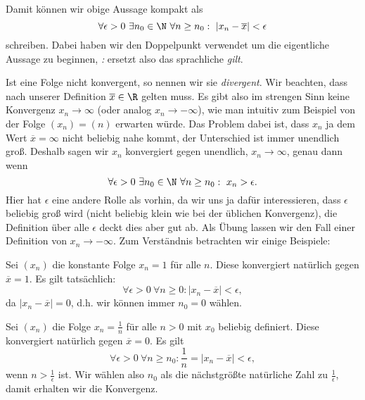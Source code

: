 \documentclass[letterpaper,10pt,english]{jupyterBook}
\begin{document}
Damit können wir obige Aussage kompakt als
\begin{equation*}
\forall \epsilon > 0 ~\exists n_0 \in \N ~\forall n \geq n_0: ~\vert x_n - \overline{x} \vert < \epsilon
\end{equation*}
schreiben. Dabei haben wir den Doppelpunkt verwendet um die eigentliche Aussage zu beginnen, \emph{:} ersetzt also das sprachliche \emph{gilt}.

Ist eine Folge nicht konvergent, so nennen wir sie \emph{divergent}. Wir beachten, dass nach unserer Definition \(\overline{x} \in \R\) gelten muss. Es gibt also im strengen Sinn keine Konvergenz \(x_n \rightarrow \infty\) (oder analog \(x_n \rightarrow -\infty\)), wie man intuitiv zum Beispiel von der Folge \((x_n) = (n)\) erwarten würde. Das Problem dabei ist, dass \(x_n\) ja dem Wert \(\overline{x}=\infty\) nicht beliebig nahe kommt, der Unterschied ist immer unendlich groß. Deshalb sagen wir \(x_n\) konvergiert gegen unendlich, \(x_n \rightarrow \infty\), genau dann wenn
\begin{equation*}
 \forall \epsilon > 0 ~\exists n_0 \in \N ~\forall n \geq n_0: ~ x_n > \epsilon .
\end{equation*}
Hier hat \(\epsilon\) eine andere Rolle als vorhin, da wir uns ja dafür interessieren, dass \(\epsilon\) beliebig groß wird (nicht beliebig klein wie bei der üblichen Konvergenz), die Definition über alle \(\epsilon\) deckt dies aber gut ab. Als Übung lassen wir den Fall einer Definition von \(x_n \rightarrow -  \infty\). Zum Verständnis betrachten wir einige Beispiele:
\label{vorkurs/folgen:example-1}
\begin{example}{}{}



Sei \((x_n)\) die konstante Folge \(x_n = 1 \) für alle \(n\). Diese konvergiert natürlich gegen \(\overline{x} = 1\). Es gilt tatsächlich:
\begin{equation*}
 \forall \epsilon > 0 ~\forall n \geq 0:  \vert x_n - \overline{x}\vert < \epsilon,\end{equation*}
da \(\vert x_n - \overline{x}\vert =0\), d.h. wir können immer \(n_0=0\) wählen.
\end{example}
\label{vorkurs/folgen:example-2}
\begin{example}{}{}



Sei \((x_n)\) die  Folge \(x_n = \frac{1}n \) für alle \(n>0\) mit \(x_0\) beliebig definiert. Diese konvergiert natürlich gegen \(\overline{x} = 0\). Es gilt
\begin{equation*}
 \forall \epsilon > 0 ~\forall n \geq n_0:  \frac{1}n = \vert x_n - \overline{x}\vert < \epsilon,\end{equation*}
wenn \(n > \frac{1}\epsilon\) ist. Wir wählen also \(n_0\) als die nächstgrößte natürliche Zahl zu \(\frac{1}\epsilon\), damit erhalten wir die Konvergenz.
\end{example}
\end{document}
